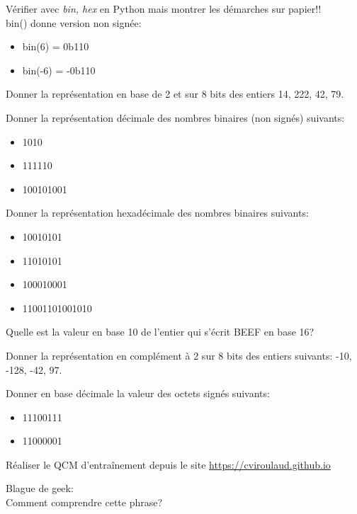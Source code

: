 \documentclass[a4paper,11pt]{article}
\begin{document}
\begin{Form}
\begin{commentprof}
Vérifier avec \emph{bin, hex} en Python mais montrer les démarches sur papier!!\\
bin() donne version non signée:
\begin{itemize}
\item bin(6) = 0b110
\item bin(-6) = -0b110
\end{itemize}
\end{commentprof}
\begin{exo}
Donner la représentation en base de 2 et sur 8 bits des entiers 14, 222, 42, 79.
\end{exo}
\begin{exo}
Donner la représentation décimale des nombres binaires (non signés) suivants:
\begin{itemize}
\item 1010
\item 111110
\item 100101001
\end{itemize}
\end{exo}
\begin{exo}
Donner la représentation hexadécimale des nombres binaires suivants:
\begin{itemize}
\item 10010101
\item 11010101
\item 100010001
\item 11001101001010
\end{itemize}
\end{exo}
\begin{exo}
Quelle est la valeur en base 10 de l'entier qui s'écrit BEEF en base 16?
\end{exo}
\begin{exo}
Donner la représentation en complément à 2 sur 8 bits des entiers suivants: -10, -128, -42, 97.
\end{exo}
\begin{exo}
Donner en base décimale la valeur des octets signés suivants:
\begin{itemize}
\item 11100111
\item 11000001
\end{itemize}
\end{exo}
\begin{exo}
Réaliser le QCM d’entraînement depuis le site \url{https://cviroulaud.github.io} 
\end{exo}
\begin{exo}
Blague de geek:\\
Comment comprendre cette phrase?
\end{exo}
\end{Form}
\end{document}
